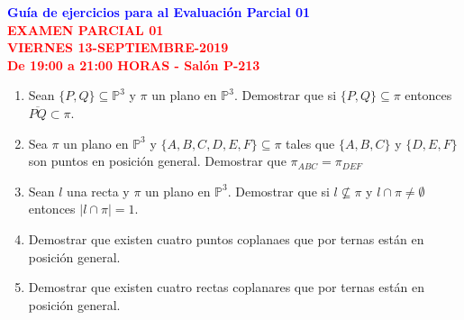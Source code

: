 \documentclass[12pt]{report}
\numberwithin{section}{chapter}
\newcommand{\p}{\mathbb P}
\begin{document}
\begin{center}
\textcolor{blue}{\textbf{\large Guía de ejercicios para al Evaluación Parcial 01}}\\
\vspace{0.5 cm}
\textcolor{red}{\textbf{\large EXAMEN PARCIAL 01 \\ VIERNES
13-SEPTIEMBRE-2019\\ De 19:00 a 21:00 HORAS - Salón P-213}}
\end{center}

\begin{enumerate}
\item Sean $\{P,Q\} \subseteq \p^3$ y $\pi$ un plano en $\p^3$. Demostrar que si $\{P,Q\} \subseteq \pi$ entonces $\overline{PQ}\subset \pi$.

\item Sea $\pi$ un plano en $\p^3$ y $\{A,B,C,D,E,F\} \subseteq \pi$ tales que $\{A,B,C\}$ y $\{D,E,F\}$ son puntos en posición general. Demostrar que $\pi_{ABC}=\pi_{DEF}$

 \item Sean $l$ una recta y $\pi$ un plano en $\p^3$. Demostrar que si $l \not\subseteq \pi$ y $l \cap \pi \neq \emptyset$ entonces $|l\cap \pi|= 1$.

 \item Demostrar que existen cuatro puntos coplanaes que por ternas están en posición general.
 
 \item Demostrar que existen cuatro rectas coplanares que por ternas están en posición general.
\end{enumerate}
\end{document}
